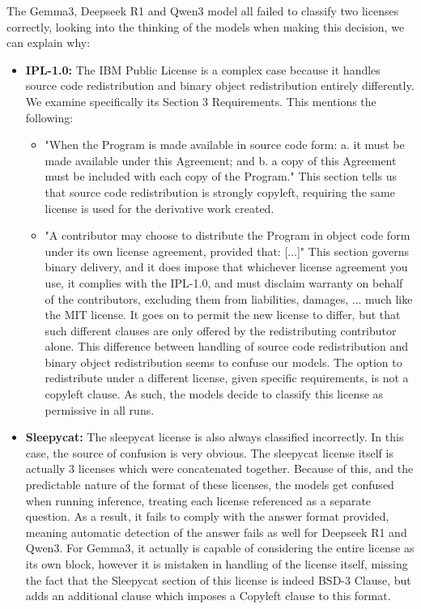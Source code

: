 The Gemma3, Deepseek R1 and Qwen3 model all failed to classify two licenses correctly, looking into the thinking of the models when making this decision, we can explain why:
\begin{itemize}
	\item \textbf{IPL-1.0:} The IBM Public License is a complex case because it handles source code redistribution and binary object redistribution entirely differently. We examine specifically its Section 3 Requirements. This mentions the following:
	\begin{itemize}
		\item "When the Program is made available in source code form: a. it must be made available under this Agreement; and b. a copy of this Agreement must be included with each copy of the Program." This section tells us that source code redistribution is strongly copyleft, requiring the same license is used for the derivative work created.
		\item "A contributor may choose to distribute the Program in object code form under its own license agreement, provided that: [...]" This section governs binary delivery, and it does impose that whichever license agreement you use, it complies with the IPL-1.0, and must disclaim warranty on behalf of the contributors, excluding them from liabilities, damages, ... much like the MIT license. It goes on to permit the new license to differ, but that such different clauses are only offered by the redistributing contributor alone.
		This difference between handling of source code redistribution and binary object redistribution seems to confuse our models. The option to redistribute under a different license, given specific requirements, is not a copyleft clause. As such, the models decide to classify this license as permissive in all runs.
	\end{itemize}
	
	\item \textbf{Sleepycat:} The sleepycat license is also always classified incorrectly. In this case, the source of confusion is very obvious. The sleepycat license itself is actually 3 licenses which were concatenated together. Because of this, and the predictable nature of the format of these licenses, the models get confused when running inference, treating each license referenced as a separate question. As a result, it fails to comply with the answer format provided, meaning automatic detection of the answer fails as well for Deepseek R1 and Qwen3. For Gemma3, it actually is capable of considering the entire license as its own block, however it is mistaken in handling of the license itself, missing the fact that the Sleepycat section of this license is indeed BSD-3 Clause, but adds an additional clause which imposes a Copyleft clause to this format.
\end{itemize}

